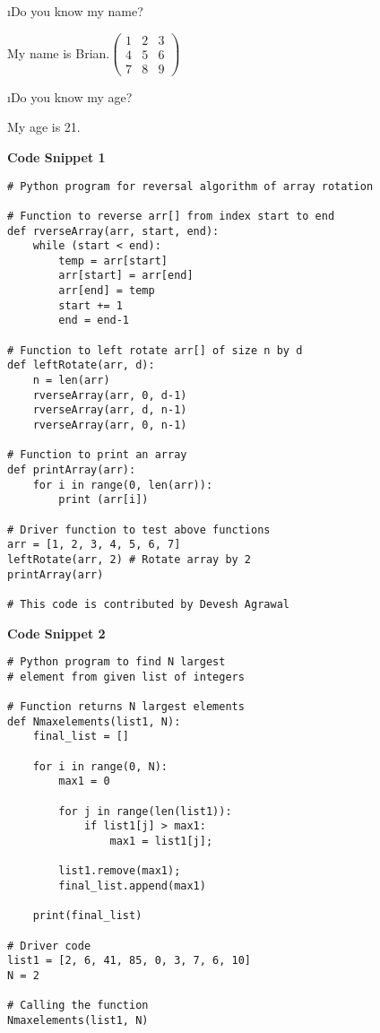 \documentclass[fleqn]{article}
\begin{document}
\bee
\i Do you know my name?
\begin{tcolorbox}
My name is Brian.\newline $\begin{pmatrix}
1 & 2 & 3\\
4 & 5 & 6\\
7 & 8 & 9
\end{pmatrix}$

\end{tcolorbox}
\i Do you know my age?
\begin{tcolorbox}
My age is 21.
\end{tcolorbox}
\ene
\leavevmode\newline
\textbf{Code Snippet 1}
\begin{lstlisting}[basicstyle=\footnotesize\ttfamily, breaklines]
# Python program for reversal algorithm of array rotation
  
# Function to reverse arr[] from index start to end
def rverseArray(arr, start, end):
    while (start < end):
        temp = arr[start]
        arr[start] = arr[end]
        arr[end] = temp
        start += 1
        end = end-1
  
# Function to left rotate arr[] of size n by d
def leftRotate(arr, d):
    n = len(arr)
    rverseArray(arr, 0, d-1)
    rverseArray(arr, d, n-1)
    rverseArray(arr, 0, n-1)
  
# Function to print an array
def printArray(arr):
    for i in range(0, len(arr)):
        print (arr[i])
  
# Driver function to test above functions
arr = [1, 2, 3, 4, 5, 6, 7]
leftRotate(arr, 2) # Rotate array by 2
printArray(arr)
  
# This code is contributed by Devesh Agrawal
\end{lstlisting}
\textbf{Code Snippet 2}
\begin{lstlisting}[basicstyle=\footnotesize\ttfamily, breaklines]
# Python program to find N largest
# element from given list of integers
  
# Function returns N largest elements
def Nmaxelements(list1, N):
    final_list = []
  
    for i in range(0, N): 
        max1 = 0
          
        for j in range(len(list1)):     
            if list1[j] > max1:
                max1 = list1[j];
                  
        list1.remove(max1);
        final_list.append(max1)
          
    print(final_list)
  
# Driver code
list1 = [2, 6, 41, 85, 0, 3, 7, 6, 10]
N = 2
  
# Calling the function
Nmaxelements(list1, N)
\end{lstlisting}
\end{document}
